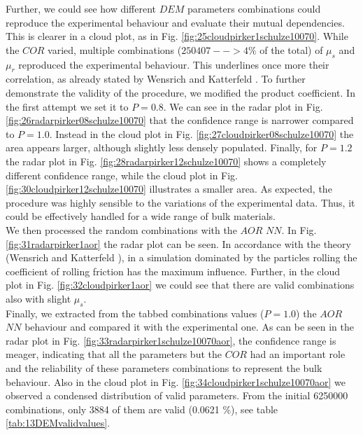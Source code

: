 Further, we could see how different $DEM$ parameters
combinations could reproduce the experimental behaviour and evaluate their mutual dependencies. 
This is clearer in a cloud plot, as in Fig. 
\ref{fig:25cloudpirker1schulze10070}. While the $COR$ varied, multiple
combinations ($250407 --> 4\% $ of the total) of $\mu_s$ and $\mu_r$ reproduced
the experimental behaviour.
This underlines once more their correlation, as already stated by Wensrich and 
Katterfeld \cite{RefWorks:87}.
To further demonstrate the validity of the procedure, we modified the product
coefficient. In the first attempt we set it to $P=0.8$. We can see in the radar plot in Fig. 
\ref{fig:26radarpirker08schulze10070} that the confidence range is narrower
compared to $P=1.0$. Instead in the cloud plot in Fig. 
\ref{fig:27cloudpirker08schulze10070} the area
appears larger, although slightly less densely populated. Finally, for $P=1.2$
the radar plot in Fig.
\ref{fig:28radarpirker12schulze10070} shows a completely different confidence
range, while the cloud plot in Fig. \ref{fig:30cloudpirker12schulze10070} 
illustrates a smaller area. As expected, the procedure was highly sensible to the variations of the experimental data. 
Thus, it could be effectively handled for a wide range of bulk materials.\\
% 
We then processed the random combinations with the $AOR$ $NN$. In Fig.
\ref{fig:31radarpirker1aor} the radar plot can be seen. In accordance with the
theory (Wensrich and Katterfeld \cite{RefWorks:87}), in a simulation dominated
by the particles rolling the coefficient of rolling friction has the maximum influence. 
Further, in the cloud plot in Fig. \ref{fig:32cloudpirker1aor}
we could see that there are valid combinations also with slight $\mu_s$. \\
Finally, we extracted from the tabbed combinations values ($P=1.0$) the $AOR$ $NN$ behaviour and compared it with the experimental one. 
As can be seen in the radar plot in Fig.
\ref{fig:33radarpirker1schulze10070aor}, the confidence range is meager, indicating that all the parameters but the $COR$ 
had an important role and the reliability of these parameters combinations to represent the bulk behaviour. 
Also in the cloud plot in Fig. \ref{fig:34cloudpirker1schulze10070aor} we
observed a condensed distribution of valid parameters.
From the initial 6250000 combinations, only 3884 of them are valid (0.0621 \%),
see table \ref{tab:13DEMvalidvalues}.








